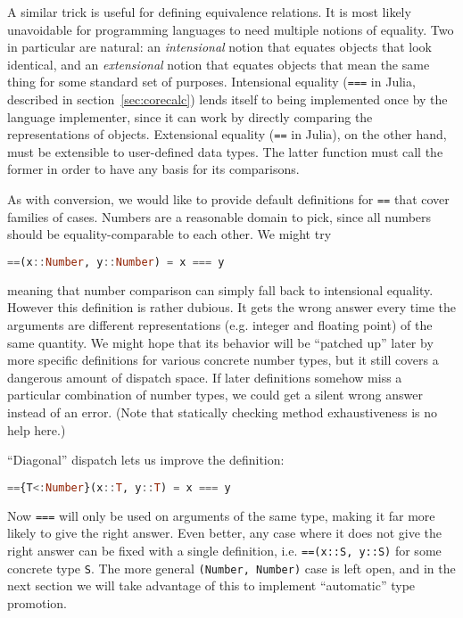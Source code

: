 A similar trick is useful for defining equivalence relations.
It is most likely unavoidable for programming languages to need multiple
notions of equality.
Two in particular are natural: an \emph{intensional}
notion that equates objects that look identical, and an \emph{extensional}
notion that equates objects that mean the same thing for some standard
set of purposes.
Intensional equality (\texttt{===} in Julia, described
in section~\ref{sec:corecalc}) lends itself to being implemented once
by the language implementer, since it can work by directly comparing
the representations of objects.
Extensional equality (\texttt{==} in Julia), on the other hand, must be
extensible to user-defined data types.
The latter function must call the former in order to have any basis for
its comparisons.

As with conversion, we would like to provide default definitions for
\texttt{==} that cover families of cases.
Numbers are a reasonable domain to pick, since all numbers should be
equality-comparable to each other.
We might try

\begin{singlespace}
\begin{lstlisting}[language=julia]
==(x::Number, y::Number) = x === y
\end{lstlisting}
\end{singlespace}

\noindent
meaning that number comparison can simply fall back to intensional
equality.
However this definition is rather dubious.
It gets the wrong answer every time the arguments are different representations
(e.g. integer and floating point) of the same quantity.
We might hope that its behavior will be ``patched up'' later by more specific
definitions for various concrete number types, but it still covers a dangerous
amount of dispatch space.
If later definitions somehow miss a particular combination of number types,
we could get a silent wrong answer instead of an error.
(Note that statically checking method exhaustiveness is no help here.)

``Diagonal'' dispatch lets us improve the definition:

\begin{singlespace}
\begin{lstlisting}[language=julia]
=={T<:Number}(x::T, y::T) = x === y
\end{lstlisting}
\end{singlespace}

\noindent
Now \texttt{===} will only be used on arguments of the same type,
making it far more likely to give the right answer.
Even better, any case where it does not give the right answer can be fixed with
a single definition, i.e. \texttt{==(x::S, y::S)} for some
concrete type \texttt{S}.
The more general \texttt{(Number, Number)} case is left open, and in the next
section we will take advantage of this to implement ``automatic'' type promotion.

